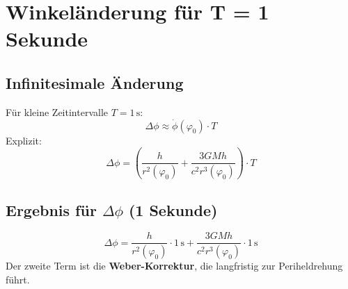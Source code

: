 \section{Winkeländerung für T = 1 Sekunde}
\subsection{Infinitesimale Änderung}
Für kleine Zeitintervalle $T = 1\,\text{s}$:
\[
\Delta \phi \approx \dot{\phi}(\varphi_0) \cdot T
\]
Explizit:
\[
\Delta \phi = \left(\frac{h}{r^2(\varphi_0)} + \frac{3GMh}{c^2 r^3(\varphi_0)}\right) \cdot T
\]

\subsection{Ergebnis für $\Delta\phi$ (1 Sekunde)}
\[
\boxed{ \Delta \phi = \frac{h}{r^2(\varphi_0)} \cdot 1\,\text{s} + \frac{3GMh}{c^2 r^3(\varphi_0)} \cdot 1\,\text{s} }
\]
Der zweite Term ist die \textbf{Weber-Korrektur}, die langfristig zur Periheldrehung führt.